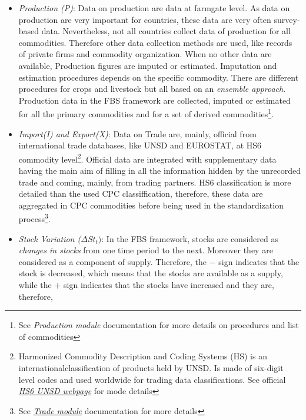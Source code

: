 \documentclass[]{article}
\let\rmarkdownfootnote\footnote%
\def\footnote{\protect\rmarkdownfootnote}
\begin{document}
\begin{itemize}
\item
  \emph{Production (P)}: Data on production are data at farmgate level.
  As data on production are very important for countries, these data are
  very often survey-based data. Nevertheless, not all countries collect
  data of production for all commodities. Therefore other data
  collection methods are used, like records of private firms and
  commodity organization. When no other data are available, Production
  figures are imputed or estimated. Imputation and estimation procedures
  depends on the specific commodity. There are different procedures for
  crops and livestock but all based on an \emph{ensemble approach}.
  Production data in the FBS framework are collected, imputed or
  estimated for all the primary commodities and for a set of derived
  commodities\footnote{See \emph{Production module} documentation for
    more details on procedures and list of commodities}.
\item
  \emph{Import(I) and Export(X)}: Data on Trade are, mainly, official
  from international trade databases, like UNSD and EUROSTAT, at HS6
  commodity level\footnote{Harmonized Commodity Description and Coding
    Systems (HS) is an internationalclassification of products held by
    UNSD. Is made of six-digit level codes and used worldwide for
    trading data classifications. See official
    \href{https://unstats.un.org/unsd/tradekb/Knowledgebase/50018/Harmonized-Commodity-Description-and-Coding-Systems-HS}{\emph{HS6
    UNSD webpage}} for mode details}. Official data are integrated with
  supplementary data having the main aim of filling in all the
  information hidden by the unrecorded trade and coming, mainly, from
  trading partners. HS6 classification is more detailed than the used
  CPC classiffication, therefore, these data are aggregated in CPC
  commodities before being used in the standardization process\footnote{See
    \href{https://github.com/SWS-Methodology/faoswsTrade/blob/master/vignettes/Documentation/tradeDocumentation.pdf}{\emph{Trade
    module}} documentation for more details}.
\item
  \emph{Stock Variation (}\(\Delta St_{t})\): In the FBS framework,
  stocks are considered as \emph{changes in stocks} from one time period
  to the next. Moreover they are considered as a component of supply.
  Therefore, the \(-\) sign indicates that the stock is decreased, which
  means that the stocks are available as a supply, while the \(+\) sign
  indicates that the stocks have increased and they are, therefore,

\end{itemize}
\end{document}
